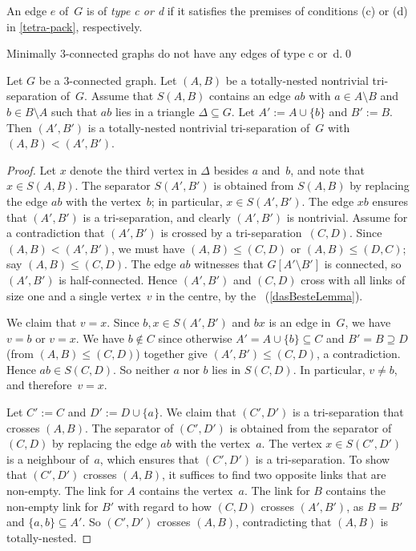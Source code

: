 \documentclass{aic}
\newcommand{\se}{\subseteq}
\theoremstyle{plain}
\theoremstyle{definition}
\theoremstyle{plain}
\theoremstyle{plain}
\newcommand{\sm}{\setminus}
\renewcommand{\le}{\leqslant}
\begin{document}
An edge $e$ of~$G$ is of \emph{type c or d} if it satisfies the premises of conditions (c) or (d) in \autoref{tetra-pack}, respectively.

\begin{obs}\label{eg17}
    Minimally 3-connected graphs do not have any edges of type c or~d.\qed
\end{obs}

\begin{lem}\label{triangleTrick}
    Let $G$ be a 3-connected graph.
    Let $(A,B)$ be a totally-nested nontrivial tri-separation of~$G$.
    Assume that $S(A,B)$ contains an edge $ab$ with $a\in A\sm B$ and $b\in B\sm A$ such that $ab$ lies in a triangle $\Delta\se G$.
    Let $A':=A\cup\{b\}$ and $B':=B$.
    Then $(A',B')$ is a totally-nested nontrivial tri-separation of~$G$ with $(A,B)<(A',B')$.
\end{lem}
\begin{proof}
    Let $x$ denote the third vertex in $\Delta$ besides $a$ and~$b$, and note that $x\in S(A,B)$.
    The separator $S(A',B')$ is obtained from $S(A,B)$ by replacing the edge $ab$ with the vertex~$b$; in particular, $x\in S(A',B')$.
    The edge $xb$ ensures that $(A',B')$ is a tri-separation, and clearly $(A',B')$ is nontrivial.
    Assume for a contradiction that $(A',B')$ is crossed by a tri-separation~$(C,D)$.
    Since $(A,B)<(A',B')$, we must have $(A,B)\le (C,D)$ or $(A,B)\le (D,C)$; say $(A,B)\le (C,D)$.
    The edge $ab$ witnesses that $G[A'\sm B']$ is connected, so $(A',B')$ is half-connected.
    Hence $(A',B')$ and $(C,D)$ cross with all links of size one and a single vertex~$v$ in the centre, by the ~(\ref{dasBesteLemma}).

    We claim that $v=x$.
    Since $b,x\in S(A',B')$ and $bx$ is an edge in~$G$, we have $v=b$ or $v=x$.
    We have $b\notin C$ since otherwise $A'=A\cup\{b\}\se C$ and $B'=B\supseteq D$ (from $(A,B)\le (C,D)$) together give $(A',B')\le (C,D)$, a contradiction.
    Hence $ab\in S(C,D)$.
    So neither $a$ nor $b$ lies in $S(C,D)$.
    In particular, $v\neq b$, and therefore~$v=x$.

    Let $C':=C$ and $D':=D\cup\{a\}$.
    We claim that $(C',D')$ is a tri-separation that crosses $(A,B)$.
    The separator of $(C',D')$ is obtained from the separator of $(C,D)$ by replacing the edge $ab$ with the vertex~$a$.
    The vertex $x\in S(C',D')$ is a neighbour of~$a$, which ensures that $(C',D')$ is a tri-separation.
    To show that $(C',D')$ crosses $(A,B)$, it suffices to find two opposite links that are non-empty.
    The link for $A$ contains the vertex~$a$.
    The link for $B$ contains the non-empty link for $B'$ with regard to how $(C,D)$ crosses $(A',B')$, as $B=B'$ and $\{a,b\}\se A'$.
    So $(C',D')$ crosses $(A,B)$, contradicting that $(A,B)$ is totally-nested.
\end{proof}
\end{document}
